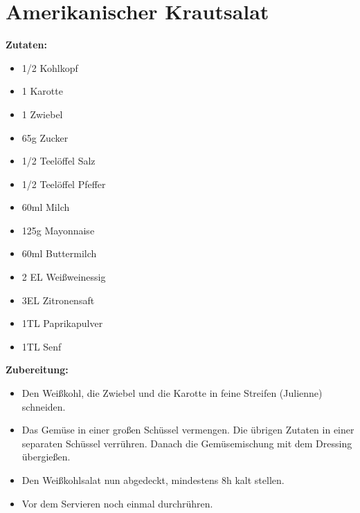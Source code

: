 \section{Amerikanischer Krautsalat}

\textbf{Zutaten:}
\begin{itemize}
  \item 1/2 Kohlkopf
  \item 1 Karotte
  \item 1 Zwiebel
  \item 65g Zucker
  \item 1/2 Teelöffel Salz
  \item 1/2 Teelöffel Pfeffer
  \item 60ml Milch
  \item 125g Mayonnaise
  \item 60ml Buttermilch
  \item 2 EL Weißweinessig
  \item 3EL Zitronensaft
  \item 1TL Paprikapulver
  \item 1TL Senf\newline
\end{itemize}

\textbf{Zubereitung:}
\begin{itemize}
  \item Den Weißkohl, die Zwiebel und die Karotte in feine Streifen (Julienne) schneiden.
  \item Das Gemüse in einer großen Schüssel vermengen. Die übrigen Zutaten in einer separaten Schüssel verrühren. Danach die Gemüsemischung mit dem Dressing übergießen.
  \item Den Weißkohlsalat nun abgedeckt, mindestens 8h kalt stellen.
  \item Vor dem Servieren noch einmal durchrühren.
\end{itemize}
